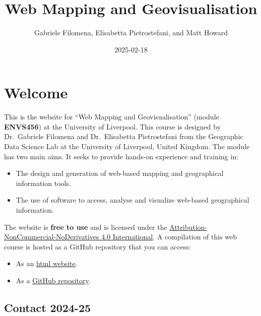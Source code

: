 \documentclass[
  letterpaper,
  DIV=11,
  numbers=noendperiod]{scrreprt}
\title{Web Mapping and Geovisualisation}
\author{Gabriele Filomena, Elisabetta Pietrostefani, and Matt Howard}
\date{2025-02-18}
\providecommand{\tightlist}{%
  \setlength{\itemsep}{0pt}\setlength{\parskip}{0pt}}\usepackage{longtable,booktabs,array}
\renewcommand*\contentsname{Table of contents}
\newcommand\contentsname{Table of contents}
\begin{document}
\maketitle

\renewcommand*\contentsname{Table of contents}
{
\hypersetup{linkcolor=}
\setcounter{tocdepth}{2}
\tableofcontents
}


\chapter*{Welcome}\label{welcome}


This is the website for ``Web Mapping and Geovisualisation'' (module
\textbf{ENVS456}) at the University of Liverpool. This course is
designed by Dr.~Gabriele Filomena and Dr.~Elisabetta Pietrostefani from
the Geographic Data Science Lab at the University of Liverpool, United
Kingdom. The module has two main aims. It seeks to provide hands-on
experience and training in:

\begin{itemize}
\tightlist
\item
  The design and generation of web-based mapping and geographical
  information tools.
\item
  The use of software to access, analyse and visualize web-based
  geographical information.
\end{itemize}

The website is \textbf{free to use} and is licensed under the
\href{https://creativecommons.org/licenses/by-nc-nd/4.0/}{Attribution-NonCommercial-NoDerivatives
4.0 International}. A compilation of this web course is hosted as a
GitHub repository that you can access:

\begin{itemize}
\tightlist
\item
  As an \href{https://gdsl-ul.github.io/wma}{html website}.
\item
  As a \href{https://github.com/GDSL-UL/wma}{GitHub repository}.
\end{itemize}

\section*{Contact 2024-25}\label{contact-2024-25}
\end{document}
